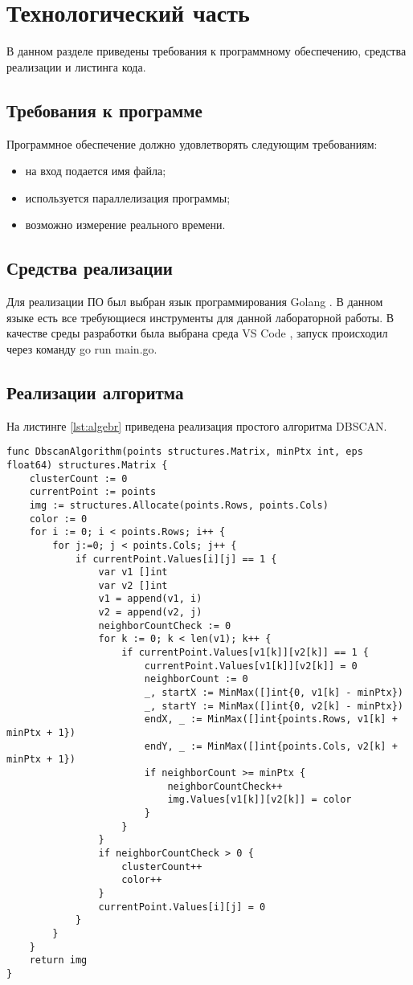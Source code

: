 \chapter{Технологический часть}

В данном разделе приведены требования к программному обеспечению, средства реализации и листинга кода.

\section{Требования к программе}

Программное обеспечение должно удовлетворять следующим требованиям:
\begin{itemize}
	\item на вход подается имя файла;
	\item используется параллелизация программы;
	\item возможно измерение реального времени.
\end{itemize}

\section{Средства реализации} 
Для реализации ПО был выбран язык программирования Golang \cite{golang}. 
В данном языке есть все требующиеся инструменты для данной лабораторной работы.
В качестве среды разработки была выбрана среда VS Code \cite{vscode}, запуск происходил через команду go run main.go.


\section{Реализации алгоритма}
На листинге \ref{lst:algebr} приведена реализация простого алгоритма DBSCAN. 
\newpage

\captionsetup{singlelinecheck = false, justification=raggedright}
\begin{lstlisting}[label=lst:algebr,caption=Реализация простого алгоритма DBSCAN]
func DbscanAlgorithm(points structures.Matrix, minPtx int, eps float64) structures.Matrix {
	clusterCount := 0
	currentPoint := points
	img := structures.Allocate(points.Rows, points.Cols)
	color := 0
	for i := 0; i < points.Rows; i++ {
		for j:=0; j < points.Cols; j++ {
			if currentPoint.Values[i][j] == 1 {
				var v1 []int
				var v2 []int
				v1 = append(v1, i)
				v2 = append(v2, j)
				neighborCountCheck := 0
				for k := 0; k < len(v1); k++ {
					if currentPoint.Values[v1[k]][v2[k]] == 1 {
						currentPoint.Values[v1[k]][v2[k]] = 0
						neighborCount := 0
						_, startX := MinMax([]int{0, v1[k] - minPtx})
						_, startY := MinMax([]int{0, v2[k] - minPtx})
						endX, _ := MinMax([]int{points.Rows, v1[k] + minPtx + 1})
						endY, _ := MinMax([]int{points.Cols, v2[k] + minPtx + 1})
						if neighborCount >= minPtx {
							neighborCountCheck++
							img.Values[v1[k]][v2[k]] = color
						}
					}
				}
				if neighborCountCheck > 0 {
					clusterCount++
					color++
				}
				currentPoint.Values[i][j] = 0
			}
		}
	}
	return img
}
\end{lstlisting}


